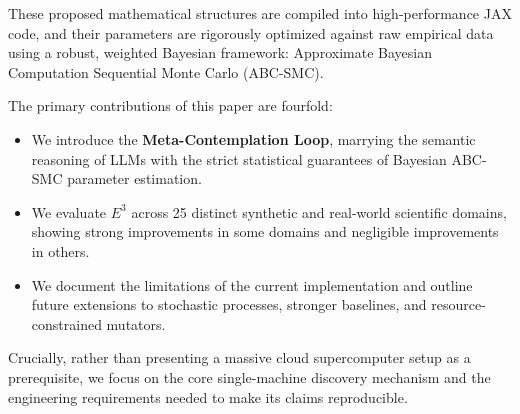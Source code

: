 These proposed mathematical structures are compiled into high-performance JAX code, and their parameters are rigorously optimized against raw empirical data using a robust, weighted Bayesian framework: Approximate Bayesian Computation Sequential Monte Carlo (ABC-SMC). 

The primary contributions of this paper are fourfold:
\begin{itemize}
    \item We introduce the \textbf{Meta-Contemplation Loop}, marrying the semantic reasoning of LLMs with the strict statistical guarantees of Bayesian ABC-SMC parameter estimation.
    \item We evaluate $E^3$ across 25 distinct synthetic and real-world scientific domains, showing strong improvements in some domains and negligible improvements in others.
    \item We document the limitations of the current implementation and outline future extensions to stochastic processes, stronger baselines, and resource-constrained mutators.
\end{itemize}

Crucially, rather than presenting a massive cloud supercomputer setup as a prerequisite, we focus on the core single-machine discovery mechanism and the engineering requirements needed to make its claims reproducible.
